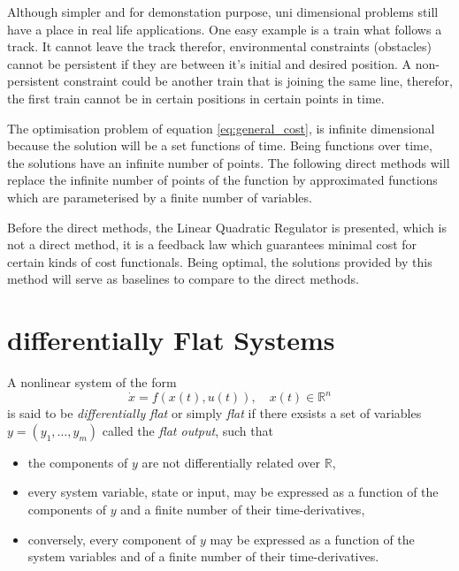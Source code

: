 \par Although simpler and for demonstation purpose, uni dimensional problems still have a place in real life applications. One easy example is a train what follows a track. It cannot leave the track therefor, environmental constraints (obstacles) cannot be persistent if they are between it's initial and desired position. A non-persistent constraint could be another train that is joining the same line, therefor, the first train cannot be in certain positions in certain points in time.

\par The optimisation problem of equation \eqref{eq:general_cost}, is infinite dimensional because the solution will be a set functions of time. Being functions over time, the solutions have an infinite number of points. The following direct methods will replace the infinite number of points of the function by approximated functions which are parameterised by a finite number of variables.
\par Before the direct methods, the Linear Quadratic Regulator is presented, which is not a direct method, it is a feedback law which guarantees minimal cost for certain kinds of cost functionals. Being optimal, the solutions provided by this method will serve as baselines to compare to the direct methods.

\section{differentially Flat Systems}

\par A nonlinear system of the form
\begin{equation}
    \dot{x} = f(x(t),u(t)), \quad x(t) \in \mathbb{R}^n
\end{equation}
is said to be \textit{differentially flat} \cite{fliess1995flatness} or simply \textit{flat} if there exsists a set of variables $y = (y_1, \dots, y_m)$ called the \textit{flat output}, such that
\begin{itemize}
    \item the components of $y$ are not differentially related over $\mathbb{R}$,
    \item every system variable, state or input, may be expressed as a function of the components of $y$ and a finite number of their time-derivatives,
    \item conversely, every component of $y$ may be expressed as a function of the system variables and of a finite number of their time-derivatives. 
\end{itemize}

